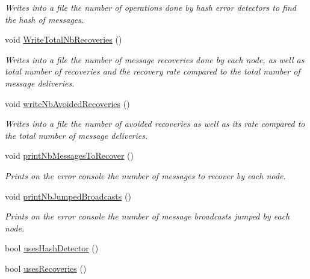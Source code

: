 \begin{DoxyCompactItemize}
\begin{DoxyCompactList}\small\item\em Writes into a file the number of operations done by hash error detectors to find the hash of messages. \end{DoxyCompactList}\item 
void \hyperlink{class_stats_a75689d1481b0605ce74d775e36c21740}{Write\+Total\+Nb\+Recoveries} ()
\begin{DoxyCompactList}\small\item\em Writes into a file the number of message recoveries done by each node, as well as total number of recoveries and the recovery rate compared to the total number of message deliveries. \end{DoxyCompactList}\item 
void \hyperlink{class_stats_ac6a0fdf44cc2a3dc11ff22eb75faacf2}{write\+Nb\+Avoided\+Recoveries} ()
\begin{DoxyCompactList}\small\item\em Writes into a file the number of avoided recoveries as well as its rate compared to the total number of message deliveries. \end{DoxyCompactList}\item 
void \hyperlink{class_stats_ae2c59851f26885a62c2e65fda16d47ee}{print\+Nb\+Messages\+To\+Recover} ()
\begin{DoxyCompactList}\small\item\em Prints on the error console the number of messages to recover by each node. \end{DoxyCompactList}\item 
void \hyperlink{class_stats_aaba10264a569b9240a300ddc341e6a8c}{print\+Nb\+Jumped\+Broadcasts} ()
\begin{DoxyCompactList}\small\item\em Prints on the error console the number of message broadcasts jumped by each node. \end{DoxyCompactList}\item 
bool \hyperlink{class_stats_a509d8e8fba4312eeffe2c6cee722f30f}{uses\+Hash\+Detector} ()
\item 
bool \hyperlink{class_stats_a876b1b2674fb82cb45b6bc4b094019ae}{uses\+Recoveries} ()
\end{DoxyCompactItemize}
